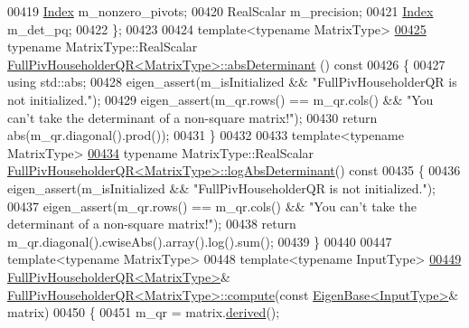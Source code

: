 \begin{DoxyCode}
00419     \hyperlink{namespace_eigen_a62e77e0933482dafde8fe197d9a2cfde}{Index} m\_nonzero\_pivots;
00420     RealScalar m\_precision;
00421     \hyperlink{namespace_eigen_a62e77e0933482dafde8fe197d9a2cfde}{Index} m\_det\_pq;
00422 \};
00423 
00424 \textcolor{keyword}{template}<\textcolor{keyword}{typename} MatrixType>
\hyperlink{group___q_r___module_a1029e1ccc70bb8669043c5775e7f3b75}{00425} \textcolor{keyword}{typename} MatrixType::RealScalar \hyperlink{group___q_r___module_a1029e1ccc70bb8669043c5775e7f3b75}{FullPivHouseholderQR<MatrixType>::absDeterminant}
      ()\textcolor{keyword}{ const}
00426 \textcolor{keyword}{}\{
00427   \textcolor{keyword}{using} std::abs;
00428   eigen\_assert(m\_isInitialized && \textcolor{stringliteral}{"FullPivHouseholderQR is not initialized."});
00429   eigen\_assert(m\_qr.rows() == m\_qr.cols() && \textcolor{stringliteral}{"You can't take the determinant of a non-square matrix!"});
00430   \textcolor{keywordflow}{return} abs(m\_qr.diagonal().prod());
00431 \}
00432 
00433 \textcolor{keyword}{template}<\textcolor{keyword}{typename} MatrixType>
\hyperlink{group___q_r___module_aafde38918912c9b562f44b0fc3b22589}{00434} \textcolor{keyword}{typename} MatrixType::RealScalar 
      \hyperlink{group___q_r___module_aafde38918912c9b562f44b0fc3b22589}{FullPivHouseholderQR<MatrixType>::logAbsDeterminant}()\textcolor{keyword}{
       const}
00435 \textcolor{keyword}{}\{
00436   eigen\_assert(m\_isInitialized && \textcolor{stringliteral}{"FullPivHouseholderQR is not initialized."});
00437   eigen\_assert(m\_qr.rows() == m\_qr.cols() && \textcolor{stringliteral}{"You can't take the determinant of a non-square matrix!"});
00438   \textcolor{keywordflow}{return} m\_qr.diagonal().cwiseAbs().array().log().sum();
00439 \}
00440 
00447 \textcolor{keyword}{template}<\textcolor{keyword}{typename} MatrixType>
00448 \textcolor{keyword}{template}<\textcolor{keyword}{typename} InputType>
\hyperlink{group___q_r___module_a41ac74d6615e52e0fd7c0aaa8d3106b4}{00449} \hyperlink{group___q_r___module}{FullPivHouseholderQR<MatrixType>}& 
      \hyperlink{group___q_r___module_class_eigen_1_1_full_piv_householder_q_r}{FullPivHouseholderQR<MatrixType>::compute}(\textcolor{keyword}{const} 
      \hyperlink{group___core___module_struct_eigen_1_1_eigen_base}{EigenBase<InputType>}& matrix)
00450 \{
00451   m\_qr = matrix.\hyperlink{group___core___module_a324b16961a11d2ecfd2d1b7dd7946545}{derived}();

\end{DoxyCode}
